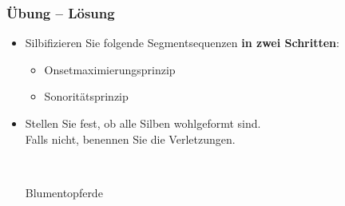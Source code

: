 
\begin{frame}
\frametitle{Übung -- Lösung}

\begin{itemize}
\item Silbifizieren Sie folgende Segmentsequenzen \textbf{in zwei Schritten}:
\begin{itemize}
	\item Onsetmaximierungsprinzip
	\item Sonoritätsprinzip
\end{itemize}

\item Stellen Sie fest, ob alle Silben wohlgeformt sind.\\
Falls nicht, benennen Sie die Verletzungen.

\begin{exe}
	\\
\end{exe}


\begin{exe}
	Blumentopferde\\ \pause
\end{exe}

\end{itemize}



\end{frame}



